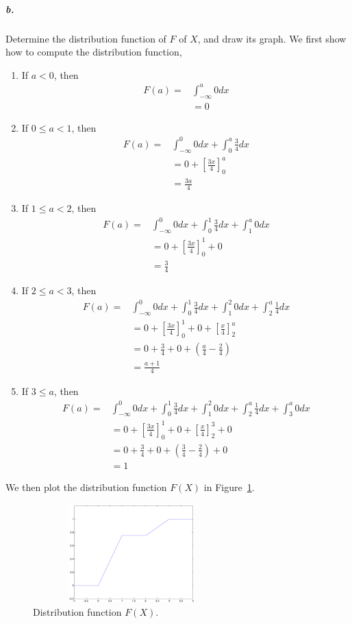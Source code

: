 \documentclass[11pt]{article} %
\begin{document}
\subparagraph*{b.} Determine the distribution function of $F$ of $X$, and draw its graph. 
We first show how to compute the distribution function, 
\begin{enumerate}
\item If $a < 0$, then 
\begin{align*}
F(a) = & \int_{-\infty}^a 0 dx  \\
& =  0 
\end{align*} 
\item If $0 \leq a < 1$, then 
\begin{align*}
F(a) = & \int_{-\infty}^0 0 dx + \int_{0}^a \frac{3}{4} dx \\
& = 0 + \left[\frac{3x}{4}\right]_{0}^a \\
& = \frac{3a}{4}
\end{align*}
\item If $1 \leq a < 2$, then
\begin{align*}
F(a) = & \int_{-\infty}^0 0 dx + \int_{0}^1 \frac{3}{4} dx + \int_{1}^a 0 dx \\
& = 0 + \left[\frac{3x}{4}\right]_{0}^1 + 0  \\
& = \frac{3}{4}
\end{align*}
\item If $2 \leq a < 3$, then 
\begin{align*}
F(a) = & \int_{-\infty}^0 0 dx + \int_{0}^1 \frac{3}{4} dx + \int_{1}^2 0 dx + \int_{2}^a \frac{1}{4} dx \\
& = 0 + \left[\frac{3x}{4}\right]_{0}^1 + 0 + \left[ \frac{x}{4} \right]_{2}^a \\
& = 0 + \frac{3}{4} + 0 + (\frac{a}{4} - \frac{2}{4}) \\
& = \frac{a+1}{4}
\end{align*}
\item If $3 \leq a$, then
\begin{align*}
F(a) = & \int_{-\infty}^0 0 dx + \int_{0}^1 \frac{3}{4} dx + \int_{1}^2 0 dx + \int_{2}^a \frac{1}{4} dx + \int_{3}^a 0 dx \\
& = 0 + \left[\frac{3x}{4}\right]_{0}^1 + 0 + \left[ \frac{x}{4}\right]_{2}^3 + 0 \\
& = 0 + \frac{3}{4} + 0 + (\frac{3}{4} - \frac{2}{4}) + 0 \\
& = 1
\end{align*}
\end{enumerate}

We then plot the distribution function $F(X)$ in Figure~\ref{Fig:ch0501b}. 
\begin{figure}[h!]
\centering
\includegraphics[width=3in, height=1.5in]{ch0501b}
\caption{Distribution function $F(X)$.}
\label{Fig:ch0501b}
\end{figure}
\end{document}
